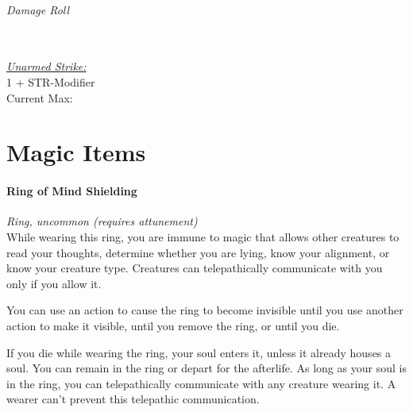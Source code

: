 \documentclass[letterpaper,openany,oneside,twocolumn]{book}
\newcommand{\PATH}{../../}
\begin{document}
\paragraph*{Damage Roll}\hfill\\
\underline{\textit{Unarmed Strike:}}\\
1 + STR-Modifier\\
\indent Current Max: 

\part*{Magic Items}



\newpage
\subsection*{Ring of Mind Shielding}
\textit{Ring, uncommon (requires attunement)}\\
While wearing this ring, you are immune to magic that allows other creatures to read your thoughts, determine whether you are lying, know your alignment, or know your creature type. Creatures can telepathically communicate with you only if you allow it.

You can use an action to cause the ring to become invisible until you use another action to make it visible, until you remove the ring, or until you die.

If you die while wearing the ring, your soul enters it, unless it already houses a soul. You can remain in the ring or depart for the afterlife. As long as your soul is in the ring, you can telepathically communicate with any creature wearing it. A wearer can't prevent this telepathic communication.
\end{document}
